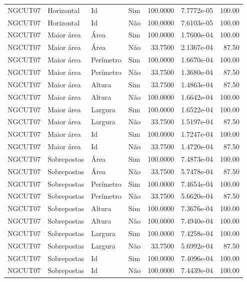 \begin{tabular}{llllrrr}
    NGCUT07   & Horizontal  & Id        & Sim         & 100.0000     & 7.7772e-05 & 100.00   \\
    NGCUT07   & Horizontal  & Id        & Não         & 100.0000     & 7.6103e-05 & 100.00   \\
    NGCUT07   & Maior área  & Área      & Sim         & 100.0000     & 1.7600e-04 & 100.00   \\
    NGCUT07   & Maior área  & Área      & Não         & 33.7500      & 2.1367e-04 & 87.50    \\
    NGCUT07   & Maior área  & Perímetro & Sim         & 100.0000     & 1.6670e-04 & 100.00   \\
    NGCUT07   & Maior área  & Perímetro & Não         & 33.7500      & 1.3680e-04 & 87.50    \\
    NGCUT07   & Maior área  & Altura    & Sim         & 33.7500      & 1.4863e-04 & 87.50    \\
    NGCUT07   & Maior área  & Altura    & Não         & 100.0000     & 1.6642e-04 & 100.00   \\
    NGCUT07   & Maior área  & Largura   & Sim         & 100.0000     & 1.6522e-04 & 100.00   \\
    NGCUT07   & Maior área  & Largura   & Não         & 33.7500      & 1.5197e-04 & 87.50    \\
    NGCUT07   & Maior área  & Id        & Sim         & 100.0000     & 1.7247e-04 & 100.00   \\
    NGCUT07   & Maior área  & Id        & Não         & 33.7500      & 1.4720e-04 & 87.50    \\
    NGCUT07   & Sobrepostas & Área      & Sim         & 100.0000     & 7.4873e-04 & 100.00   \\
    NGCUT07   & Sobrepostas & Área      & Não         & 33.7500      & 5.7478e-04 & 87.50    \\
    NGCUT07   & Sobrepostas & Perímetro & Sim         & 100.0000     & 7.4654e-04 & 100.00   \\
    NGCUT07   & Sobrepostas & Perímetro & Não         & 33.7500      & 5.6620e-04 & 87.50    \\
    NGCUT07   & Sobrepostas & Altura    & Sim         & 100.0000     & 7.3676e-04 & 100.00   \\
    NGCUT07   & Sobrepostas & Altura    & Não         & 100.0000     & 7.4940e-04 & 100.00   \\
    NGCUT07   & Sobrepostas & Largura   & Sim         & 100.0000     & 7.4258e-04 & 100.00   \\
    NGCUT07   & Sobrepostas & Largura   & Não         & 33.7500      & 5.6992e-04 & 87.50    \\
    NGCUT07   & Sobrepostas & Id        & Sim         & 100.0000     & 7.4096e-04 & 100.00   \\
    NGCUT07   & Sobrepostas & Id        & Não         & 100.0000     & 7.4439e-04 & 100.00   \\
    \hline
\end{tabular}